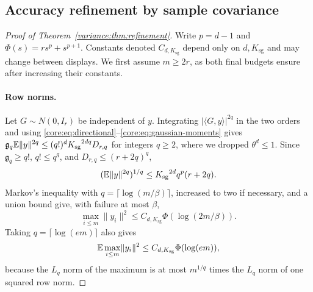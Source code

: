 \documentclass[11pt,a4paper]{article}
\theoremstyle{definition}\newtheorem{definition}[theorem]{Definition}
\theoremstyle{remark}\newtheorem{remark}[theorem]{Remark}
\numberwithin{equation}{section}
\newcommand{\Ksg}{{K_{\mathrm{sg}}}}\newcommand{\Cfour}{{C_4}}
\newcommand{\gmom}{\mathfrak g}
\newcommand{\norm}[1]{\lVert#1\rVert}\newcommand{\ip}[2]{\langle#1,#2\rangle}
\begin{document}
\subsection{Accuracy refinement by sample covariance}
\label{appendix:variance-refinement}
\begin{proof}[Proof of Theorem~\ref{variance:thm:refinement}]
Write $p=d-1$ and $\Phi(s)=rs^p+s^{p+1}$.
Constants denoted $C_{d,\Ksg}$ depend only on $d,\Ksg$ and may change
between displays. We first assume $m\ge2r$, as both final budgets ensure
after increasing their constants.

\paragraph{Row norms.}
Let $G\sim N(0,I_r)$ be independent of $y$. Integrating
$|\ip Gy|^{2q}$ in the two orders and using
\eqref{core:eq:directional}--\eqref{core:eq:gaussian-moments} gives
$\gmom_q\E\norm y^{2q}\le(q!)^d\Ksg^{2dq}D_{r,q}$ for integers $q\ge2$,
where we dropped $\theta^d\le1$. Since $\gmom_q\ge q!$, $q!\le q^q$,
and $D_{r,q}\le(r+2q)^q$,
\begin{equation}\label{variance:eq:row-moment}
 (\E\norm y^{2q})^{1/q}\le\Ksg^{2d}q^p(r+2q).
\end{equation}
Markov's inequality with $q=\lceil\log(m/\beta)\rceil$, increased to two
if necessary, and a union bound give, with failure at most $\beta$,
\begin{equation}\label{variance:eq:row-maximum}
 \max_{i\le m}\norm{y_i}^2
 \le C_{d,\Ksg}\Phi(\log(2m/\beta)).
\end{equation}
Taking $q=\lceil\log(em)\rceil$ also gives
\begin{equation}\label{variance:eq:expected-maximum}
 \E\max_{i\le m}\norm{y_i}^2\le C_{d,\Ksg}\Phi(\log(em)),
\end{equation}
because the $L_q$ norm of the maximum is at most $m^{1/q}$ times
the $L_q$ norm of one squared row norm.


\end{proof}
\end{document}
